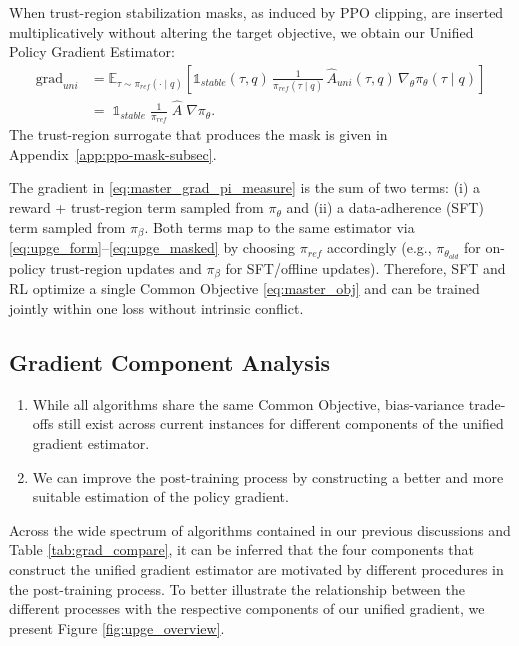\documentclass{article} %
\newcommand{\0}{\mathbb{0}}
\newcommand{\1}{\mathbb{1}}
\newcommand{\E}{\mathbb{E}}
\begin{document}
When trust-region stabilization masks, as induced by PPO clipping, are inserted multiplicatively without altering the target objective, we obtain our Unified Policy Gradient Estimator:
\begin{equation}
\label{eq:upge_masked}
\begin{aligned}
\mathrm{grad}_{uni}
&=
\E_{\tau\sim \pi_{ref}(\cdot\mid q)}\!\left[
\mathbb{1}_{stable}(\tau,q)\,
\frac{1}{\pi_{ref}(\tau\mid q)}\,
\widehat{A}_{uni}(\tau,q)\,
\nabla_\theta \pi_\theta(\tau\mid q)
\right]
\\[2pt]
&=\;
\mathbb{1}_{stable}\;
\frac{1}{\pi_{ref}}\;
\hat{A}\;
\nabla \pi_\theta.
\end{aligned}
\end{equation}
The trust-region surrogate that produces the mask is given in Appendix~\ref{app:ppo-mask-subsec}.


The gradient in \eqref{eq:master_grad_pi_measure} is the sum of two terms: (i) a reward + trust-region term sampled from $\pi_\theta$ and (ii) a data-adherence (SFT) term sampled from $\pi_\beta$. Both terms map to the same estimator via \eqref{eq:upge_form}–\eqref{eq:upge_masked} by choosing $\pi_{ref}$ accordingly (e.g., $\pi_{\theta_{old}}$ for on-policy trust-region updates and $\pi_\beta$ for SFT/offline updates). Therefore, SFT and RL optimize a single Common Objective \eqref{eq:master_obj} and can be trained jointly within one loss without intrinsic conflict.



\subsection{Gradient Component Analysis} \label{sec:component-analysis}

\begin{tcolorbox}[takeawaysbox]
\begin{enumerate}[leftmargin=1em]
    \item While all algorithms share the same Common Objective, bias-variance trade-offs still exist across current instances for different components of the unified gradient estimator.
    \item We can improve the post-training process by constructing a better and more suitable estimation of the policy gradient.
\end{enumerate}


\end{tcolorbox}


Across the wide spectrum of algorithms contained in our previous discussions and Table \ref{tab:grad_compare}, it can be inferred that the four components that construct the unified gradient estimator are motivated by different procedures in the post-training process. 
To better illustrate the relationship between the different processes with the respective components of our unified gradient, we present Figure \ref{fig:upge_overview}.
\end{document}
